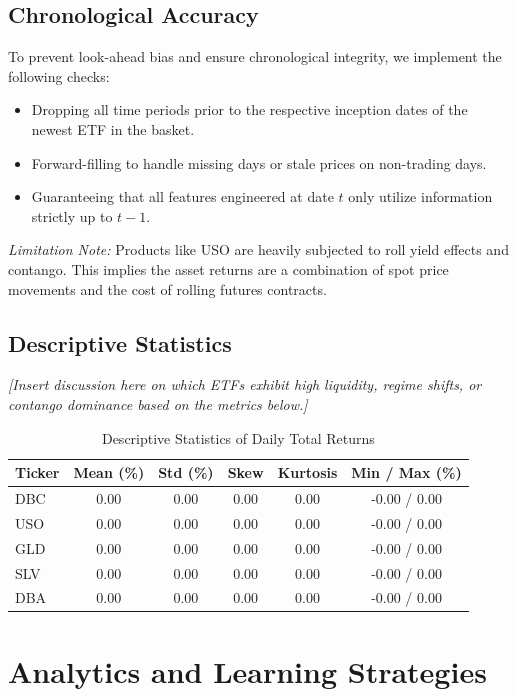 \documentclass[a4paper,oneside]{scrbook}
\begin{document}
\subsection{Chronological Accuracy}
To prevent look-ahead bias and ensure chronological integrity, we implement the following checks:
\begin{itemize}
    \item Dropping all time periods prior to the respective inception dates of the newest ETF in the basket.
    \item Forward-filling to handle missing days or stale prices on non-trading days.
    \item Guaranteeing that all features engineered at date $t$ only utilize information strictly up to $t-1$.
\end{itemize}
\textit{Limitation Note:} Products like USO are heavily subjected to roll yield effects and contango. This implies the asset returns are a combination of spot price movements and the cost of rolling futures contracts.

\subsection{Descriptive Statistics}
\textit{[Insert discussion here on which ETFs exhibit high liquidity, regime shifts, or contango dominance based on the metrics below.]}

\begin{table}[h]
\centering
\caption{Descriptive Statistics of Daily Total Returns}
\begin{tabular}{lccccc}
\toprule
\textbf{Ticker} & \textbf{Mean (\%)} & \textbf{Std (\%)} & \textbf{Skew} & \textbf{Kurtosis} & \textbf{Min / Max (\%)} \\
\midrule
DBC & 0.00 & 0.00 & 0.00 & 0.00 & -0.00 / 0.00 \\
USO & 0.00 & 0.00 & 0.00 & 0.00 & -0.00 / 0.00 \\
GLD & 0.00 & 0.00 & 0.00 & 0.00 & -0.00 / 0.00 \\
SLV & 0.00 & 0.00 & 0.00 & 0.00 & -0.00 / 0.00 \\
DBA & 0.00 & 0.00 & 0.00 & 0.00 & -0.00 / 0.00 \\
\bottomrule
\end{tabular}
\end{table}

\section{Analytics and Learning Strategies}
\end{document}
